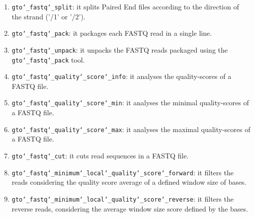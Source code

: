 \begin{enumerate}
\item \texttt{gto\char`_fastq\char`_split}: it splits Paired End files according to the direction of the strand ('/1' or '/2').

\item \texttt{gto\char`_fastq\char`_pack}: it packages each FASTQ read in a single line.

\item \texttt{gto\char`_fastq\char`_unpack}: it unpacks the FASTQ reads packaged using the \texttt{gto\char`_fastq\char`_pack} tool.

\item \texttt{gto\char`_fastq\char`_quality\char`_score\char`_info}: it analyses the quality-scores of a FASTQ file.

\item \texttt{gto\char`_fastq\char`_quality\char`_score\char`_min}: it analyses the minimal quality-scores of a FASTQ file.

\item \texttt{gto\char`_fastq\char`_quality\char`_score\char`_max}: it analyses the maximal quality-scores of a FASTQ file.

\item \texttt{gto\char`_fastq\char`_cut}: it cuts read sequences in a FASTQ file. 

\item \texttt{gto\char`_fastq\char`_minimum\char`_local\char`_quality\char`_score\char`_forward}: it filters the reads considering the quality score average of a defined window size of bases.

\item \texttt{gto\char`_fastq\char`_minimum\char`_local\char`_quality\char`_score\char`_reverse}: it filters the reverse reads, considering the average window size score defined by the bases.


\end{enumerate}




























